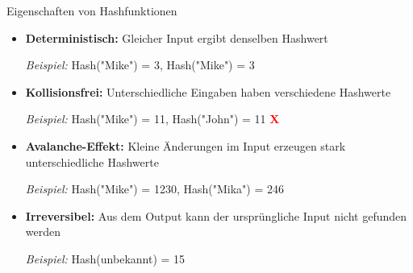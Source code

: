 \documentclass[aspectratio=169,xcolor=dvipsnames, t]{beamer}
\begin{document}
\begin{frame}{Eigenschaften von Hashfunktionen}

\setlength{\itemsep}{1.8em} 
\setlength{\parskip}{0.4em} 

\begin{itemize}
    \item \textbf{Deterministisch:}  
    Gleicher Input ergibt denselben Hashwert  
    
    \vspace{0.6em}
    \textit{Beispiel:} Hash("Mike") = 3, Hash("Mike") = 3

    \vspace{0.6em}
    \item \textbf{Kollisionsfrei:}  
    Unterschiedliche Eingaben haben verschiedene Hashwerte  
    
    \vspace{0.6em}
    \textit{Beispiel:} Hash("Mike") = 11, Hash("John") = 11 \textcolor{red}{\textbf{X}}

    \vspace{0.6em}
    \item \textbf{Avalanche-Effekt:}  
    Kleine Änderungen im Input erzeugen stark unterschiedliche Hashwerte  
    
    \vspace{0.6em}
    \textit{Beispiel:} Hash("Mike") = 1230, Hash("Mika") = 246

    \vspace{0.6em}
    \item \textbf{Irreversibel:}  
    Aus dem Output kann der ursprüngliche Input nicht gefunden werden  
    
    \vspace{0.6em}
    \textit{Beispiel:} Hash(unbekannt) = 15
\end{itemize}

\end{frame}
\end{document}
